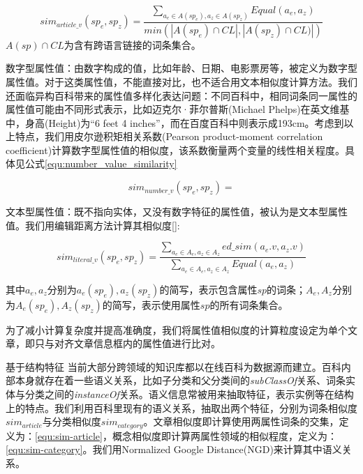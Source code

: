 \begin{equation}
\label{equ:article_value_similarity}
sim_{article\_v}(sp_e, sp_z) = \frac{\sum_{a_e\in A(sp_e), a_z \in A(sp_z)} Equal(a_e, a_z)}{min(\left| A(sp_e)\cap CL \right|, \left|A(sp_z) \cap CL) \right|)}
\end{equation}
$A(sp)\cap CL$为含有跨语言链接的词条集合。

数字型属性值：由数字构成的值，比如年龄、日期、电影票房等，被定义为数字型属性值。对于这类属性值，不能直接对比，也不适合用文本相似度计算方法。我们还面临异构百科带来的属性值多样化表达问题：不同百科中，相同词条同一属性的属性值可能由不同形式表示，比如迈克尔·菲尔普斯(Michael Phelps)在英文维基中，身高(Height)为“6 feet 4 inches”，而在百度百科中则表示成193cm。考虑到以上特点，我们用皮尔逊积矩相关系数(Pearson product-moment correlation coefficient)计算数字型属性值的相似度，该系数衡量两个变量的线性相关程度。具体见公式\ref{equ:number_value_similarity}

\begin{equation}
\label{equ:number_value_similarity}
sim_{number\_v}(sp_e, sp_z) =
\end{equation}

文本型属性值：既不指向实体，又没有数字特征的属性值，被认为是文本型属性值。我们用编辑距离方法计算其相似度\ref{}:

\begin{equation}
\label{equ:literal_value_similarity}
sim_{literal\_v}(sp_e, sp_z) = \frac { \sum _{ { a }_{ e }\in { A }_{ e },{ a }_{ z }\in { A }_{ z } }{ ed\_ sim\left( { a }_{ e }.v,{ a }_{ z }.v \right)  }  }{ \sum _{ { a }_{ e }\in { A }_{ e },{ a }_{ z }\in { A }_{ z } }{ Equal\left( { a }_{ e },{ a }_{ z } \right)  }  }  
\end{equation}

其中$a_e, a_z$分别为$a_e(sp_e), a_z(sp_z)$的简写，表示包含属性$sp$的词条；$A_e, A_z$分别为$A_e(sp_e),A_z(sp_z)$的简写，表示使用属性$sp$的所有词条集合。

为了减小计算复杂度并提高准确度，我们将属性值相似度的计算粒度设定为单个文章，即只与对齐文章信息框内的属性值进行比对。

{\heiti 基于结构特征}
当前大部分跨领域的知识库都以在线百科为数据源而建立。百科内部本身就存在着一些语义关系，比如子分类和父分类间的\textit{subClassOf}关系、词条实体与分类之间的\textit{instanceOf}关系。语义信息常被用来抽取特征\cite{wang2014cross}，表示实例等在结构上的特点。我们利用百科里现有的语义关系，抽取出两个特征，分别为词条相似度$sim_{article}$与分类相似度$sim_{category}$。文章相似度即计算使用两属性词条的交集，定义为：\ref{equ:sim-article}，概念相似度即计算两属性领域的相似程度，定义为：\ref{equ:sim-category}。我们用Normalized Google Distance(NGD)来计算其中语义关系。

